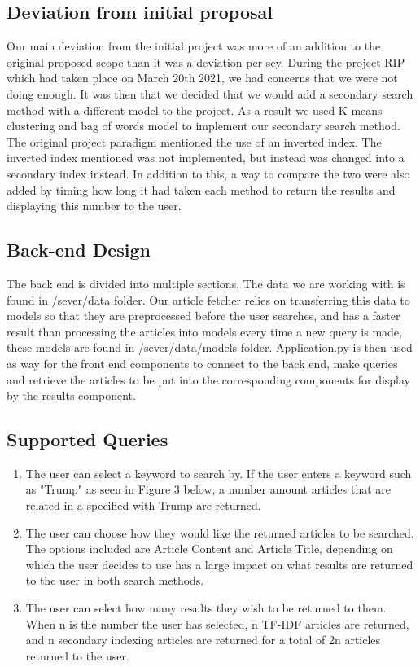 \documentclass{article}
\begin{document}
\subsection{Deviation from initial proposal}
Our main deviation from the initial project was more of an addition to the original proposed scope than it was a deviation per sey.
During the project RIP which had taken place on March 20th 2021, we had concerns that we were not doing enough.
It was then that we decided that we would add a secondary search method with a different model to the project. As a result we used K-means clustering and bag of words model to implement our secondary search method.
The original project paradigm mentioned the use of an inverted index.
The inverted index mentioned was not implemented, but instead was changed into a secondary index instead.
In addition to this, a way to compare the two were also added by timing how long it had taken each method to return the results and displaying this number to the user.

\subsection{Back-end Design}
The back end is divided into multiple sections. \newline
The data we are working with is found in /sever/data folder. \newline
Our article fetcher relies on transferring this data to models so that they are preprocessed before the user searches, and has a faster result than processing the articles into models every time a new query is made, these models are found in /sever/data/models folder.\newline
Application.py is then used as way for the front end components to connect to the back end, make queries and retrieve the articles to be put into the corresponding components for display by the results component.
\subsection{Supported Queries}
\begin{enumerate}
    \item The user can select a keyword to search by. If the user enters a keyword such as "Trump" as seen in Figure 3 below, a number amount articles that are related in a specified with Trump are returned.
    \item The user can choose how they would like the returned articles to be searched. The options included are Article Content and Article Title, depending on which the user decides to use has a large impact on what results are returned to the user in both search methods.
    \item The user can select how many results they wish to be returned to them. When n is the number the user has selected, n TF-IDF articles are returned, and n secondary indexing articles are returned for a total of 2n articles returned to the user.
\end{enumerate}
\end{document}
